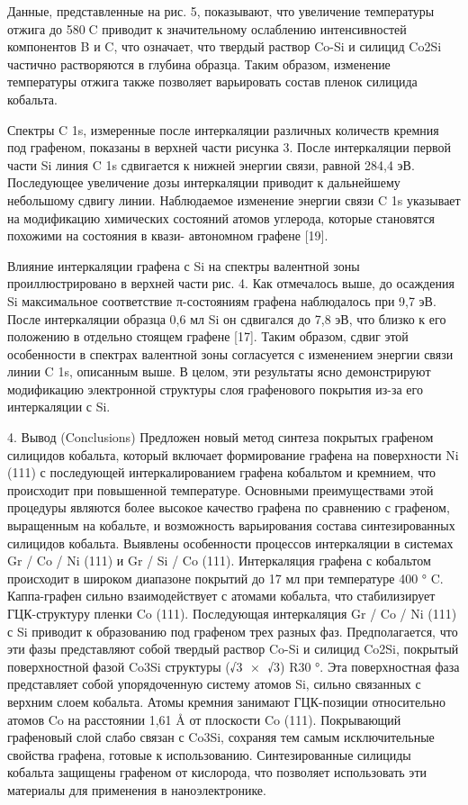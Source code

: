 Данные, представленные на рис. 5, показывают, что увеличение температуры отжига до 580C приводит к значительному ослаблению интенсивностей компонентов B и C, что означает, что твердый раствор Co-Si и силицид Co2Si частично растворяются в глубина образца. Таким образом, изменение температуры отжига также позволяет варьировать состав пленок силицида кобальта.

Спектры C 1s, измеренные после интеркаляции различных количеств кремния под графеном, показаны в верхней части рисунка 3. После интеркаляции первой части Si линия C 1s сдвигается к нижней энергии связи, равной 284,4 эВ. Последующее увеличение дозы интеркаляции приводит к дальнейшему небольшому сдвигу линии. Наблюдаемое изменение энергии связи C 1s указывает на модификацию химических состояний атомов углерода, которые становятся похожими на состояния в квази- автономном графене [19].

Влияние интеркаляции графена с Si на спектры валентной зоны проиллюстрировано в верхней части рис. 4. Как отмечалось выше, до осаждения Si максимальное соответствие π-состояниям графена наблюдалось при 9,7 эВ. После интеркаляции образца 0,6 мл Si он сдвигался до 7,8 эВ, что близко к его положению в отдельно стоящем графене [17]. Таким образом, сдвиг этой особенности в спектрах валентной зоны согласуется с изменением энергии связи линии C 1s, описанным выше. В целом, эти результаты ясно демонстрируют модификацию электронной структуры слоя графенового покрытия из-за его интеркаляции с Si.





4. Вывод (Conclusions)
Предложен новый метод синтеза покрытых графеном силицидов кобальта, который включает формирование графена на поверхности Ni (111) с последующей интеркалированием графена кобальтом и кремнием, что происходит при повышенной температуре. Основными преимуществами этой процедуры являются более высокое качество графена по сравнению с графеном, выращенным на кобальте, и возможность варьирования состава синтезированных силицидов кобальта. Выявлены особенности процессов интеркаляции в системах Gr / Co / Ni (111) и Gr / Si / Co (111). Интеркаляция графена с кобальтом происходит в широком диапазоне покрытий до 17 мл при температуре 400 ° C. Каппа-графен сильно взаимодействует с атомами кобальта, что стабилизирует ГЦК-структуру пленки Co (111). Последующая интеркаляция Gr / Co / Ni (111) с Si приводит к образованию под графеном трех разных фаз. Предполагается, что эти фазы представляют собой твердый раствор Co-Si и силицид Co2Si, покрытый поверхностной фазой Co3Si структуры (√3 × √3) R30 °. Эта поверхностная фаза представляет собой упорядоченную систему атомов Si, сильно связанных с верхним слоем кобальта. Атомы кремния занимают ГЦК-позиции относительно атомов Co на расстоянии 1,61 Å от плоскости Co (111). Покрывающий графеновый слой слабо связан с Co3Si, сохраняя тем самым исключительные свойства графена, готовые к использованию. Синтезированные силициды кобальта защищены графеном от кислорода, что позволяет использовать эти материалы для применения в наноэлектронике.

